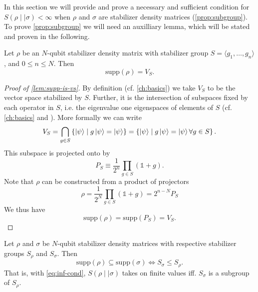 In this section we will provide and prove a necessary and sufficient condition
for $S(\rho\mid\mid\sigma)<\infty$ when $\rho$ and $\sigma$ are stabilizer
density matrices (\cref{prop:subgroup}). 
To prove \cref{prop:subgroup} we will need an auxilliary lemma, which will
be stated and proven in the following.
\begin{lem}\label{lem:supp-is-vs}
  Let $\rho$ be an $N$-qubit stabilizer density matrix with stabilizer group $S = \langle
  g_1, \ldots, g_n \rangle$, and $0\leq n \leq N$.
  Then \[ \mathrm{supp}(\rho) = V_{S}.\]
\end{lem}
\begin{proof}[Proof of \cref{lem:supp-is-vs}]
  By definition (cf. \cref{ch:basics}) we take $V_{S}$ to be the vector space
  stabilized by $S$.  Further, it is the intersection of subspaces fixed by
  each operator in $S$, i.e. the eigenvalue one eigenspaces of elements of $S$
  (cf.  \cref{ch:basics} and \cite{nielsenQuantumComputationQuantum2010}). More
  formally we can write
  \[ 
    V_S = \bigcap_{g \in S}  \left\{\ket{\psi} \mid g\ket{\psi} =
    \ket{\psi}\right\} = \left\{\ket{\psi} \mid g\ket{\psi} =
    \ket{\psi} \forall g \in S\right\}.
  \]
  This subspace is projected onto by
  \[ P_S \equiv \frac{1}{2^n} \prod_{g\in S} \left(\mathds{1} + g\right).\]
  Note that $\rho$ can be constructed from a product of projectors
  \cite{gottesmanStabilizerCodesQuantum1997}
  \[ \rho = \frac{1}{2^N} \prod_{g \in S} \left(\mathds{1} + g\right) = 2^{n-N} P_S \]
  We thus have
  \[ \mathrm{supp}(\rho) = \mathrm{supp}(P_S) = V_S. \]
\end{proof}

\begin{prop}\label{prop:subgroup}
  Let $\rho$ and $\sigma$ be $N$-qubit stabilizer density matrices with
  respective stabilizer groups $S_\rho$ and $S_\sigma$. Then
  \[ \mathrm{supp}(\rho)\subseteq \mathrm{supp}(\sigma) \Longleftrightarrow
  S_\sigma \leq S_\rho. \]
  That is, with \cref{eq:inf-cond}, $S(\rho\mid\mid\sigma)$ takes on finite values iff. $S_\sigma$ is a
  subgroup of $S_\rho$.
\end{prop}

